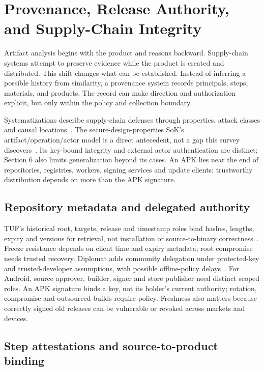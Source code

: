 \section{Provenance, Release Authority, and Supply-Chain Integrity}
\label{sec:provenance}

Artifact analysis begins with the product and reasons backward. Supply-chain systems attempt to preserve evidence while the product is created and distributed. This shift changes what can be established. Instead of inferring a possible history from similarity, a provenance system records principals, steps, materials, and products. The record can make direction and authorization explicit, but only within the policy and collection boundary.

Systematizations describe supply-chain defenses through properties, attack classes and causal locations~\cite{astra,properties,ladisa}. The secure-design-properties SoK's artifact/operation/actor model is a direct antecedent, not a gap this survey discovers~\cite{properties}. Its key-bound integrity and external actor authentication are distinct; Section 6 also limits generalization beyond its cases. An APK lies near the end of repositories, registries, workers, signing services and update clients: trustworthy distribution depends on more than the APK signature.

\subsection{Repository metadata and delegated authority}

TUF's historical root, targets, release and timestamp roles bind hashes, lengths, expiry and versions for retrieval, not installation or source-to-binary correctness~\cite{tuf}. Freeze resistance depends on client time and expiry metadata; root compromise needs trusted recovery. Diplomat adds community delegation under protected-key and trusted-developer assumptions, with possible offline-policy delays~\cite{diplomat}. For Android, source approver, builder, signer and store publisher need distinct scoped roles. An APK signature binds a key, not its holder's current authority; rotation, compromise and outsourced builds require policy. Freshness also matters because correctly signed old releases can be vulnerable or revoked across markets and devices.

\subsection{Step attestations and source-to-product binding}

